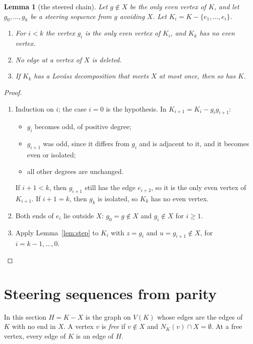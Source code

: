 \documentclass[11pt]{amsart}
\newtheorem{lemma}[theorem]{Lemma}
\theoremstyle{definition}
\newcommand{\lean}[1]{\quad{\footnotesize[Lean: \texttt{#1}]}}
\begin{document}
\begin{lemma}[the steered chain]\label{lem:chain}
Let $g\notin X$ be the only even vertex of $K$, and let $g_0,\dots,g_k$ be a steering sequence from $g$
avoiding $X$. Let $K_i=K-\{e_1,\dots,e_i\}$.
\begin{enumerate}
\item For $i<k$ the vertex $g_i$ is the only even vertex of $K_i$, and $K_k$ has no even vertex.
\item No edge at a vertex of $X$ is deleted.
\item If $K_k$ has a Lov\'asz decomposition that meets $X$ at most once, then so has $K$.
\end{enumerate}
\lean{steer\_meetsOnce}
\end{lemma}

\begin{proof}
\begin{enumerate}
\item Induction on $i$; the case $i=0$ is the hypothesis. In $K_{i+1}=K_i-g_ig_{i+1}$:
  \begin{itemize}
  \item $g_i$ becomes odd, of positive degree;
  \item $g_{i+1}$ was odd, since it differs from $g_i$ and is adjacent to it, and it becomes even or
  isolated;
  \item all other degrees are unchanged.
  \end{itemize}
  If $i+1<k$, then $g_{i+1}$ still has the edge $e_{i+2}$, so it is the only even vertex of $K_{i+1}$.
  If $i+1=k$, then $g_k$ is isolated, so $K_k$ has no even vertex.
\item Both ends of $e_i$ lie outside $X$: $g_0=g\notin X$ and $g_i\notin X$ for $i\ge1$.
\item Apply Lemma~\ref{lem:step} to $K_i$ with $z=g_i$ and $u=g_{i+1}\notin X$, for $i=k-1,\dots,0$.
\qedhere
\end{enumerate}
\end{proof}

\section{Steering sequences from parity}\label{sec:parity}

In this section $H=K-X$ is the graph on $V(K)$ whose edges are the edges of $K$ with no end in $X$. A
vertex $v$ is \emph{free} if $v\notin X$ and $N_K(v)\cap X=\emptyset$. At a free vertex, every edge of
$K$ is an edge of $H$.
\end{document}
